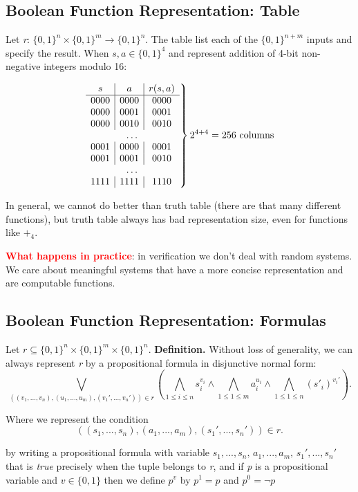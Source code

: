 \documentclass[11pt]{article}
\begin{document}
\subsection*{Boolean Function Representation: Table}

Let \textit{r}: $\{0, 1\}^{n} \times \{0, 1\}^{m} \to \{0, 1\}^{n}$. The table list each of the $\{0,1\}^{n+m}$ inputs and specify the result. When $s, a \in \{0, 1\}^{4}$ and represent addition of 4-bit non-negative integers modulo 16:

\[
\left.
\begin{array}{c|c|c}
s & a & r(s,a) \\
\hline
0000 & 0000 & 0000 \\
0000 & 0001 & 0001 \\
0000 & 0010 & 0010 \\
\multicolumn{3}{c}{\dots} \\
0001 & 0000 & 0001 \\
0001 & 0001 & 0010 \\
\multicolumn{3}{c}{\dots} \\
1111 & 1111 & 1110
\end{array}
\right\}
2^{4+4} = 256 \text{ columns}
\]

In general, we cannot do better than truth table (there are that many different functions), but truth table always has bad representation size, even for functions like $+_4$. 

\textbf{\textcolor{red}{What happens in practice}}: in verification we don't deal with random systems. We care about meaningful systems that have a more concise representation and are computable functions. 

\subsection*{Boolean Function Representation: Formulas}

\begin{tcolorbox}[
    enhanced,
    frame hidden,
    borderline west={2pt}{0pt}{black},
    boxsep=5pt,
    left=8pt
]
Let $r \subseteq \{0, 1\}^{n} \times \{0, 1\}^{m} \times \{0, 1\}^{n}$. \textbf{Definition.} Without loss of generality, we can always represent \textit{r} by a propositional formula in disjunctive normal form: 
\[
	\bigvee_{((v_1, ..., v_n),(u_1,...,u_m), (v_1', ..., v_n'))\in r}\left(\bigwedge_{1 \leq i \leq n}s_i^{v_i} \land \bigwedge_{1 \leq 1 \leq m} a_i^{u_i} \land \bigwedge_{1 \leq 1 \leq n} (s'_i)^{v_i'}\right)
.\] 

Where we represent the condition 
\[
	((s_1, ..., s_n), (a_1, ..., a_m), (s_1', ..., s_n')) \in r
.\] 

by writing a propositional formula with variable $s_1, ..., s_n, \, a_1, ..., a_m, \, s_1', ..., s_n'$ that is \textit{true} precisely when the tuple belongs to \textit{r}, and if \textit{p} is a propositional variable and $v \in \{0, 1\}$ then we define $p^{v}$ by $p^{1} = p$ and $p^{0} = \neg p$
\end{tcolorbox}
\end{document}
